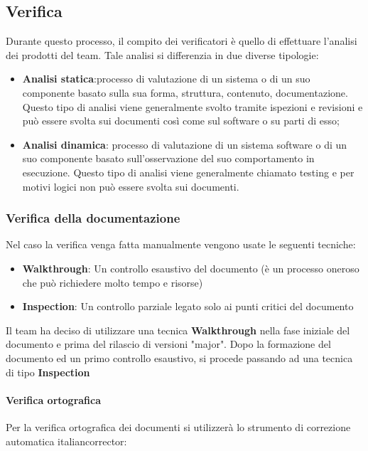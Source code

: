 \documentclass[12pt]{article}
\begin{document}
\label{Verifica}
\subsection{Verifica}
Durante questo processo, il compito dei verificatori è quello di effettuare l’analisi dei prodotti del team.
Tale analisi si differenzia in due diverse tipologie:
\begin{itemize}
    \item \textbf{Analisi statica}:processo di valutazione di un sistema o di un suo componente basato sulla sua
          forma, struttura, contenuto, documentazione. Questo tipo di analisi viene generalmente svolto
          tramite ispezioni e revisioni e può essere svolta sui documenti così come sul software o su parti
          di esso;

    \item \textbf{Analisi dinamica}: processo di valutazione di un sistema software o di un suo componente
          basato sull’osservazione del suo comportamento in esecuzione. Questo tipo di analisi viene
          generalmente chiamato testing e per motivi logici non può essere svolta sui documenti.
\end{itemize}


\subsubsection{Verifica della documentazione}
Nel caso la verifica venga fatta manualmente vengono usate le seguenti tecniche:
\begin{itemize}
    \item \textbf{Walkthrough}: Un controllo esaustivo del documento (è un processo oneroso che può richiedere molto tempo e risorse)
    \item \textbf{Inspection}: Un controllo parziale legato solo ai punti critici del documento
\end{itemize}
Il team ha deciso di utilizzare una tecnica \textbf{Walkthrough} nella fase iniziale del documento e prima del rilascio di versioni "major".
Dopo la formazione del documento ed un primo controllo esaustivo, si procede passando ad una tecnica di tipo \textbf{Inspection}
\paragraph{Verifica ortografica}
Per la verifica ortografica dei documenti  si utilizzerà lo strumento di correzione
automatica italiancorrector:
\end{document}
